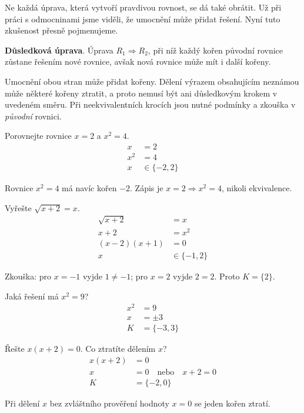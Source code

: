 \documentclass[11pt,a4paper]{article}
\begin{document}
Ne každá úprava, která vytvoří pravdivou rovnost, se dá také obrátit. Už při práci s odmocninami jsme viděli, že umocnění může přidat řešení. Nyní tuto zkušenost přesně pojmenujeme.
\begin{definiceBox}
\textbf{Důsledková úprava}. Úprava $R_1\Rightarrow R_2$, při níž každý kořen původní rovnice zůstane řešením nové rovnice, avšak nová rovnice může mít i další kořeny.
\end{definiceBox}
Umocnění obou stran může přidat kořeny. Dělení výrazem obsahujícím neznámou může některé kořeny ztratit, a proto nemusí být ani důsledkovým krokem v uvedeném směru. Při neekvivalentních krocích jsou nutné podmínky a zkouška v \emph{původní} rovnici.
\begin{prikladReseniBox}[title={Příklad 1}]
Porovnejte rovnice $x=2$ a $x^2=4$.
\tcblower
\begin{align*}
x &=2 \\
 x^2 &=4 \\
 x &\in\{-2,2\}
\end{align*}

Rovnice $x^2=4$ má navíc kořen $-2$. Zápis je $x=2\Rightarrow x^2=4$, nikoli ekvivalence.
\end{prikladReseniBox}
\begin{prikladReseniBox}[title={Příklad 2}]
Vyřešte $\sqrt{x+2}=x$.
\tcblower
\begin{align*}
\sqrt{x+2} &=x \\
 x+2 &=x^2 \\
 (x-2)(x+1)&=0 \\
 x&\in\{-1,2\}
\end{align*}

Zkouška: pro $x=-1$ vyjde $1\ne-1$; pro $x=2$ vyjde $2=2$. Proto $K=\{2\}$.
\end{prikladReseniBox}
\begin{zadaniReseniBox}[title={Úloha 1}]
Jaká řešení má $x^2=9$?
\tcblower
\begin{align*}
x^2&=9 \\
 x&=\pm3 \\
 K&=\{-3,3\}
\end{align*}
\end{zadaniReseniBox}
\begin{zadaniReseniBox}[title={Úloha 2}]
Řešte $x(x+2)=0$. Co ztratíte dělením $x$?
\tcblower
\begin{align*}
x(x+2)&=0 \\
 x&=0\quad\text{nebo}\quad x+2=0 \\
 K&=\{-2,0\}
\end{align*}

Při dělení $x$ bez zvláštního prověření hodnoty $x=0$ se jeden kořen ztratí.
\end{zadaniReseniBox}
\end{document}
